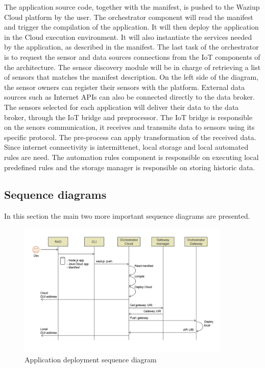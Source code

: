 The application source code, together with the manifest, is pushed to the Waziup Cloud platform by the user. 
The orchestrator component will read the manifest and trigger the compilation of the application. 
It will then deploy the application in the Cloud execution environment. 
It will also instantiate the services needed by the application, as described in the manifest. 
The last task of the orchestrator is to request the sensor and data sources connections from the IoT components of the architecture. 
The sensor discovery module will be in charge of retrieving a list of sensors that matches the manifest description.
On the left side of the diagram, the sensor owners can register their sensors with the platform. 
External data sources such as Internet APIs can also be connected directly to the data broker. 
The sensors selected for each application will deliver their data to the data broker, through the IoT bridge and preprocessor. 
The IoT bridge is responsible on the senors communication, it receives and transmits data to sensors using its specific protocol. 
The pre-process can apply transformation of the received data. 
Since internet connectivity is intermittenet, local storage and local automated rules are need. 
The automation rules component is responsible on executing local predefined rules and the storage manager is responsible on storing historic data.

\subsection{Sequence diagrams}
In this section the main two more important sequence diagrams are presented. 

\begin{figure}[h!]
\centering
\includegraphics[width=0.9\textwidth]{figs/SeqdeployApp.png}
\caption{Application deployment sequence diagram}
\label{fig:SeqdeployApp}
\end{figure}

